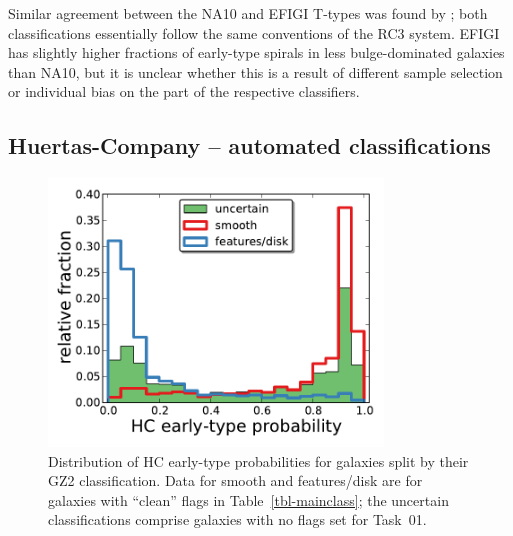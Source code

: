 \documentclass[useAMS,usenatbib]{mn2e}
\begin{document}
Similar agreement between the NA10 and EFIGI T-types was found by \citet{bai11}; both classifications essentially follow the same conventions of the RC3 system. EFIGI has slightly higher fractions of early-type spirals in less bulge-dominated galaxies than NA10, but it is unclear whether this is a result of different sample selection or individual bias on the part of the respective classifiers.

%
%
%
%

\subsection{Huertas-Company -- automated classifications}

\begin{figure}
\includegraphics[angle=0,width=3.5in]{figures/hc_histogram.pdf}
\caption{Distribution of HC early-type probabilities for galaxies split by their GZ2 classification. Data for smooth and features/disk are for galaxies with ``clean'' flags in Table~\ref{tbl-mainclass}; the uncertain classifications comprise galaxies with no flags set for Task~01. 
\label{fig-hc_histogram}}
\end{figure}
\end{document}
